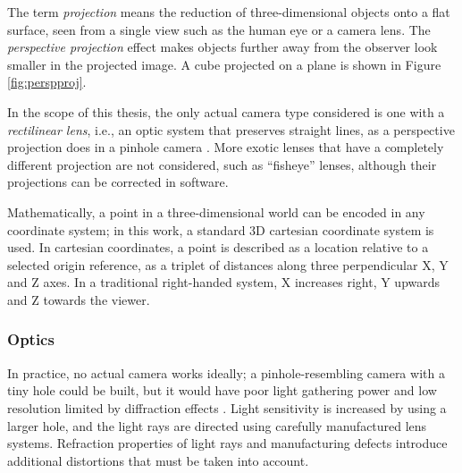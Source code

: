 The term \emph{projection} means the reduction of three-dimensional objects onto a flat surface, seen from a single view such as the human eye or a camera lens.
The \emph{perspective projection} effect makes objects further away from the observer look smaller in the projected image.
A cube projected on a plane is shown in Figure \ref{fig:perspproj}.

In the scope of this thesis, the only actual camera type considered is one with a \emph{rectilinear lens}, i.e., an optic system that preserves straight lines, as a perspective projection does in a pinhole camera \cite{greenleaf1950photographic}.
More exotic lenses that have a completely different projection are not considered, such as ``fisheye'' lenses, although their projections can be corrected in software.




Mathematically, a point in a three-dimensional world can be encoded in any coordinate system;
in this work, a standard 3D cartesian coordinate system is used.
In cartesian coordinates, a point is described as a location relative to a selected origin reference, as a triplet of distances along three perpendicular X, Y and Z axes.
In a traditional right-handed system, X increases right, Y upwards and Z towards the viewer.


\subsubsection{Optics} %

In practice, no actual camera works ideally; a pinhole-resembling camera with a tiny hole could be built, but it would have poor light gathering power and low resolution limited by diffraction effects \cite[p.~29]{greenleaf1950photographic}.
Light sensitivity is increased by using a larger hole, and the light rays are directed using carefully manufactured lens systems.
Refraction properties of light rays and manufacturing defects introduce additional distortions that must be taken into account.

